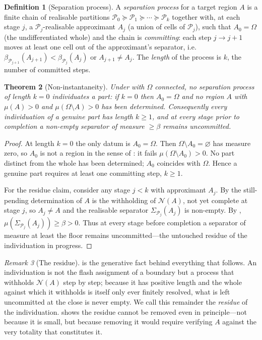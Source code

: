 \documentclass[11pt,a4paper]{article}
\theoremstyle{thmstyle}
\newtheorem{theorem}{Theorem}[section]
\theoremstyle{definition}
\newtheorem{definition}[theorem]{Definition}
\theoremstyle{remark}
\newtheorem{remark}[theorem]{Remark}
\newcommand{\Space}{\Omega}
\newcommand{\thick}{\beta}
\newcommand{\Part}{\mathscr{P}}
\newcommand{\Neg}{\mathcal{N}}
\begin{document}
\begin{definition}[Separation process]
\label{def:process}
A \emph{separation process} for a target region $A$ is a finite chain of
realisable partitions
$\Part_0\succeq\Part_1\succeq\cdots\succeq\Part_k$
together with, at each stage $j$, a $\Part_j$-realisable approximant $A_j$
(a union of cells of $\Part_j$), such that $A_0=\Space$ \textup{(}the
undifferentiated whole\textup{)} and the chain is \emph{committing}: each step
$j\to j+1$ moves at least one cell out of the approximant's separator, i.e.\
$\thick_{\Part_{j+1}}(A_{j+1})<\thick_{\Part_j}(A_j)$ or
$A_{j+1}\neq A_j$. The \emph{length} of the process is $k$, the number of
committed steps.
\end{definition}

\begin{theorem}[Non-instantaneity]
\label{thm:noninstant}
Under  with $\Space$ connected, no separation process of length
$k=0$ individuates a part: if $k=0$ then $A_0=\Space$ and no region $A$ with
$\mu(A)>0$ and $\mu(\Space\setminus A)>0$ has been determined. Consequently every
individuation of a genuine part has length $k\ge1$, and at every stage prior to
completion a non-empty separator of measure $\ge\thick$ remains uncommitted.
\end{theorem}

\begin{proof}
At length $k=0$ the only datum is $A_0=\Space$. Then $\Space\setminus A_0=\varnothing$
has measure zero, so $A_0$ is not a region in the sense of \Cref{def:region}: it
fails $\mu(\Space\setminus A_0)>0$. No part distinct from the whole has been
determined; $A_0$ coincides with $\Space$. Hence a genuine part requires at least
one committing step, $k\ge1$.

For the residue claim, consider any stage $j<k$ with approximant $A_j$. By
\Cref{thm:negation-unique} the still-pending determination of $A$ is the
withholding of $\Neg(A)$, not yet complete at stage $j$, so $A_j\neq A$ and the
realisable separator $\Sigma_{\Part_j}(A_j)$ is non-empty. By
, $\mu(\Sigma_{\Part_j}(A_j))\ge\thick>0$. Thus at every
stage before completion a separator of measure at least the floor remains
uncommitted---the untouched residue of the individuation in progress.
\end{proof}

\begin{remark}[The residue]
\label{rem:residue-origin}
 is the generative fact behind everything that follows. An
individuation is not the flash assignment of a boundary but a process that
withholds $\Neg(A)$ step by step; because it has positive length and the whole
against which it withholds is itself only ever finitely resolved, what is left
uncommitted at the close is never empty. We call this remainder the
\emph{residue} of the individuation. \Cref{sec:residue} shows the residue cannot
be removed even in principle---not because it is small, but because removing it
would require verifying $A$ against the very totality that constitutes it.
\end{remark}
\end{document}
